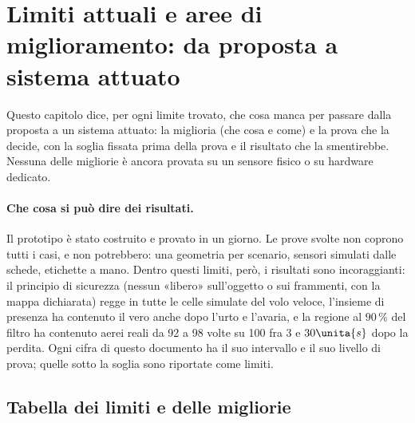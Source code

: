 \section{Limiti attuali e aree di miglioramento: da proposta a sistema attuato}\label{sec:ps}

Questo capitolo dice, per ogni limite trovato, che cosa manca per passare dalla proposta a un sistema attuato: la miglioria (che cosa e come) e la prova che la decide, con la soglia fissata prima della prova e il risultato che la smentirebbe. Nessuna delle migliorie è ancora provata su un sensore fisico o su hardware dedicato.

\paragraph{Che cosa si può dire dei risultati.} Il prototipo è stato costruito e provato in un giorno. Le prove svolte non coprono tutti i casi, e non potrebbero: una geometria per scenario, sensori simulati dalle schede, etichette a mano. Dentro questi limiti, però, i risultati sono incoraggianti: il principio di sicurezza (nessun «libero» sull'oggetto o sui frammenti, con la mappa dichiarata) regge in tutte le celle simulate del volo veloce, l'insieme di presenza ha contenuto il vero anche dopo l'urto e l'avaria, e la regione al $90\,\%$ del filtro ha contenuto aerei reali da 92 a 98 volte su 100 fra $3$ e $30\unita{s}$ dopo la perdita. Ogni cifra di questo documento ha il suo intervallo e il suo livello di prova; quelle sotto la soglia sono riportate come limiti.

\subsection{Tabella dei limiti e delle migliorie}\label{sec:ps-tabella}

